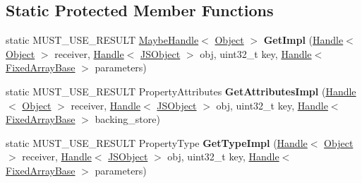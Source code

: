 \subsection*{Static Protected Member Functions}
\begin{DoxyCompactItemize}
\item 
\hypertarget{classv8_1_1internal_1_1_sloppy_arguments_elements_accessor_af2c215fe6e40e8135d7fb9c34f1b952f}{}static M\+U\+S\+T\+\_\+\+U\+S\+E\+\_\+\+R\+E\+S\+U\+L\+T \hyperlink{classv8_1_1internal_1_1_maybe_handle}{Maybe\+Handle}$<$ \hyperlink{classv8_1_1internal_1_1_object}{Object} $>$ {\bfseries Get\+Impl} (\hyperlink{classv8_1_1internal_1_1_handle}{Handle}$<$ \hyperlink{classv8_1_1internal_1_1_object}{Object} $>$ receiver, \hyperlink{classv8_1_1internal_1_1_handle}{Handle}$<$ \hyperlink{classv8_1_1internal_1_1_j_s_object}{J\+S\+Object} $>$ obj, uint32\+\_\+t key, \hyperlink{classv8_1_1internal_1_1_handle}{Handle}$<$ \hyperlink{classv8_1_1internal_1_1_fixed_array_base}{Fixed\+Array\+Base} $>$ parameters)\label{classv8_1_1internal_1_1_sloppy_arguments_elements_accessor_af2c215fe6e40e8135d7fb9c34f1b952f}

\item 
\hypertarget{classv8_1_1internal_1_1_sloppy_arguments_elements_accessor_a3e0da8123c948ee41356f76f25f9f56c}{}static M\+U\+S\+T\+\_\+\+U\+S\+E\+\_\+\+R\+E\+S\+U\+L\+T Property\+Attributes {\bfseries Get\+Attributes\+Impl} (\hyperlink{classv8_1_1internal_1_1_handle}{Handle}$<$ \hyperlink{classv8_1_1internal_1_1_object}{Object} $>$ receiver, \hyperlink{classv8_1_1internal_1_1_handle}{Handle}$<$ \hyperlink{classv8_1_1internal_1_1_j_s_object}{J\+S\+Object} $>$ obj, uint32\+\_\+t key, \hyperlink{classv8_1_1internal_1_1_handle}{Handle}$<$ \hyperlink{classv8_1_1internal_1_1_fixed_array_base}{Fixed\+Array\+Base} $>$ backing\+\_\+store)\label{classv8_1_1internal_1_1_sloppy_arguments_elements_accessor_a3e0da8123c948ee41356f76f25f9f56c}

\item 
\hypertarget{classv8_1_1internal_1_1_sloppy_arguments_elements_accessor_a5c68986eaec62cc3bb1c5297fa816f7e}{}static M\+U\+S\+T\+\_\+\+U\+S\+E\+\_\+\+R\+E\+S\+U\+L\+T Property\+Type {\bfseries Get\+Type\+Impl} (\hyperlink{classv8_1_1internal_1_1_handle}{Handle}$<$ \hyperlink{classv8_1_1internal_1_1_object}{Object} $>$ receiver, \hyperlink{classv8_1_1internal_1_1_handle}{Handle}$<$ \hyperlink{classv8_1_1internal_1_1_j_s_object}{J\+S\+Object} $>$ obj, uint32\+\_\+t key, \hyperlink{classv8_1_1internal_1_1_handle}{Handle}$<$ \hyperlink{classv8_1_1internal_1_1_fixed_array_base}{Fixed\+Array\+Base} $>$ parameters)\label{classv8_1_1internal_1_1_sloppy_arguments_elements_accessor_a5c68986eaec62cc3bb1c5297fa816f7e}


\end{DoxyCompactItemize}
